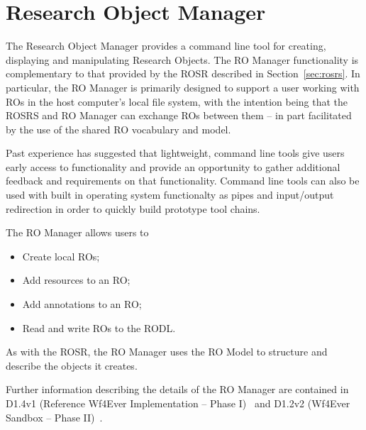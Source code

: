 \section{Research Object Manager}
\label{sec:manager}

The Research Object Manager provides a command line tool for creating, displaying and manipulating Research Objects. The RO Manager functionality is complementary to that provided by the ROSR described in Section~\ref{sec:rosrs}. In particular, the RO Manager is primarily designed to support a user working with ROs in the host computer's local file system, with the intention being that the ROSRS and RO Manager can exchange ROs between them -- in part facilitated by the use of the shared RO vocabulary and model.

Past experience has suggested that lightweight, command line tools give users early access to functionality and provide an opportunity to gather additional feedback and requirements on that functionality. Command line tools can also be used with built in operating system functionalty as pipes and input/output redirection in order to quickly build prototype tool chains.

The RO Manager allows users to 
\begin{itemize}
\item Create local ROs;
\item Add resources to an RO;
\item Add annotations to an RO;
\item Read and write ROs to the RODL.
\end{itemize}

As with the ROSR, the RO Manager uses the RO Model to structure and describe the objects it creates.

Further information describing the details of the RO Manager are contained in D1.4v1 (Reference Wf4Ever Implementation -- Phase I)~\cite{D1.4v1} and D1.2v2 (Wf4Ever Sandbox -- Phase II)~\cite{D1.2v2}.
